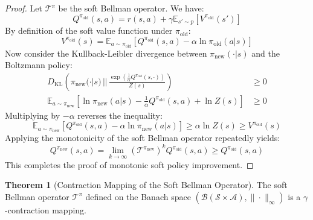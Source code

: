 \documentclass[11pt,a4paper]{article}
\theoremstyle{definition}
\newtheorem{theorem}{\textbf{Theorem}}[section]
\begin{document}
\begin{proof}
Let $\mathcal{T}^{\pi}$ be the soft Bellman operator. We have:
{\boldmath
\begin{equation}
Q^{\pi_{\text{old}}}(s, a) = r(s, a) + \gamma \mathbb{E}_{s' \sim p} \left[ V^{\pi_{\text{old}}}(s') \right]
\end{equation}
}
By definition of the soft value function under $\pi_{\text{old}}$:
{\boldmath
\begin{equation}
V^{\pi_{\text{old}}}(s) = \mathbb{E}_{a \sim \pi_{\text{old}}} \left[ Q^{\pi_{\text{old}}}(s, a) - \alpha \ln \pi_{\text{old}}(a | s) \right]
\end{equation}
}
Now consider the Kullback-Leibler divergence between $\pi_{\text{new}}(\cdot | s)$ and the Boltzmann policy:
{\boldmath
\begin{align}
D_{\text{KL}}\left(\pi_{\text{new}}(\cdot | s) \,||\, \frac{\exp\left(\frac{1}{\alpha} Q^{\pi_{\text{old}}}(s, \cdot)\right)}{Z(s)}\right) &\ge 0 \\
\mathbb{E}_{a \sim \pi_{\text{new}}}\left[ \ln \pi_{\text{new}}(a | s) - \frac{1}{\alpha} Q^{\pi_{\text{old}}}(s, a) + \ln Z(s) \right] &\ge 0
\end{align}
}
Multiplying by $-\alpha$ reverses the inequality:
{\boldmath
\begin{equation}
\mathbb{E}_{a \sim \pi_{\text{new}}}\left[ Q^{\pi_{\text{old}}}(s, a) - \alpha \ln \pi_{\text{new}}(a | s) \right] \ge \alpha \ln Z(s) \ge V^{\pi_{\text{old}}}(s)
\end{equation}
}
Applying the monotonicity of the soft Bellman operator repeatedly yields:
{\boldmath
\begin{equation}
Q^{\pi_{\text{new}}}(s, a) = \lim_{k \to \infty} (\mathcal{T}^{\pi_{\text{new}}})^k Q^{\pi_{\text{old}}}(s, a) \ge Q^{\pi_{\text{old}}}(s, a)
\end{equation}
}
This completes the proof of monotonic soft policy improvement.
\end{proof}

\begin{theorem}[Contraction Mapping of the Soft Bellman Operator]
The soft Bellman operator $\mathcal{T}^\pi$ defined on the Banach space $(\mathcal{B}(\mathcal{S} \times \mathcal{A}), \|\cdot\|_\infty)$ is a $\gamma$-contraction mapping.
\end{theorem}
\end{document}
